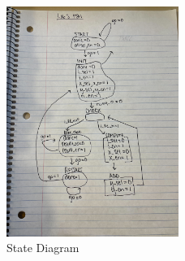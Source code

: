 \documentclass{article}
\begin{document}
\begin{figure}[H]
  \centering
  \includegraphics[width=0.5\textwidth]{state_diagram.jpg}
  \caption{State Diagram}
  \label{fig:state-diagram}
\end{figure}
\end{document}

